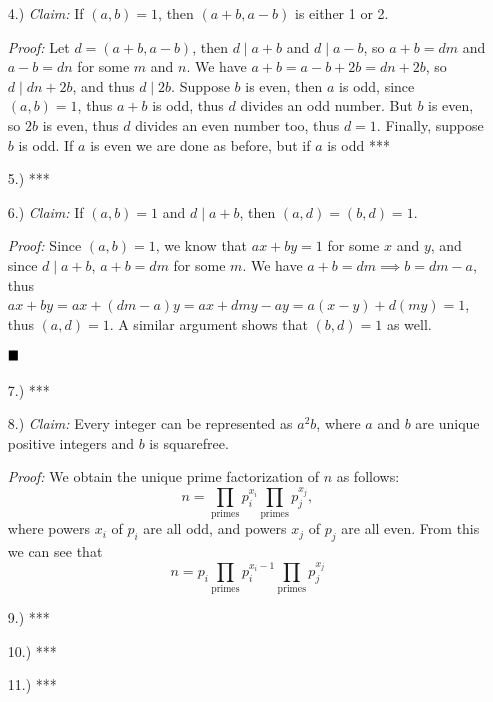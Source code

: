 \documentclass[12pt]{article}
\newcommand{\claim}{\textit{Claim: }}
\newcommand{\proof}{\textit{Proof: }}
\newcommand{\done}{
    \ensuremath{\strut\hfill\blacksquare}
}
\begin{document}
\begin{itemize}
        \item [4.)] \claim If $(a,b) = 1$, then $(a + b, a - b)$ is either 1
        or 2.

        \proof Let $d = (a + b, a - b)$, then $d \mid a + b$ and
        $d \mid a - b$, so $a + b = dm$ and $a - b = dn$ for some $m$ and $n$.
        We have $a + b = a - b + 2b = dn + 2b$, so $d \mid dn + 2b$, and thus
        $d \mid 2b$.
        Suppose $b$ is even, then $a$ is odd, since $(a,b) = 1$, thus $a + b$
        is odd, thus $d$ divides an odd number.
        But $b$ is even, so $2b$ is even, thus $d$ divides an even number too,
        thus $d = 1$.
        Finally, suppose $b$ is odd.
        If $a$ is even we are done as before, but if $a$ is odd ***

        \item [5.)] ***

        \item [6.)] \claim If $(a,b) = 1$ and $d \mid a + b$, then
        $(a,d) = (b,d) = 1$.

        \proof Since $(a,b) = 1$, we know that $ax + by = 1$ for some $x$ and
        $y$, and since $d \mid a + b$, $a + b = dm$ for some $m$.
        We have $a + b = dm \implies b = dm - a$, thus
        $ax+by=ax + (dm - a)y = ax + dmy - ay = a(x-y)+d(my)=1$,
        thus $(a,d) = 1$.
        A similar argument shows that $(b,d) = 1$ as well.
        \done

        \item [7.)] ***

        \item [8.)] \claim Every integer can be represented as $a^2b$, where
        $a$ and $b$ are unique positive integers and $b$ is squarefree.

        \proof We obtain the unique prime factorization of $n$ as follows:
        \[
            n
            = \prod_{\text{primes}} p_i^{x_i} \prod_{\text{primes}} p_j^{x_j}
            ,
        \]
        where powers $x_i$ of $p_i$ are all odd, and powers $x_j$ of $p_j$
        are all even.
        From this we can see that
        \[
            n
            = p_i \prod_{\text{primes}} p_i^{x_i - 1}
            \prod_{\text{primes}} p_j^{x_j}
        \]
        

        \item [9.)] ***

        \item [10.)] ***

        \item [11.)] ***


\end{itemize}
\end{document}
